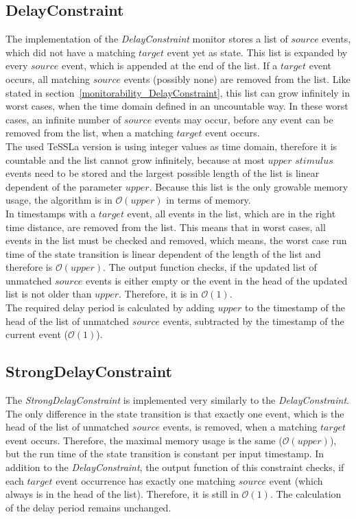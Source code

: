 \subsection{DelayConstraint}
	The implementation of the \emph{DelayConstraint} monitor stores a list of $source$ events, which did not have a matching $target$ event yet as state. This list is expanded by every $source$ event, which is appended at the end of the list. If a $target$ event occurs, all matching $source$ events (possibly none) are removed from the list. Like stated in section~\ref{monitorability_DelayConstraint}, this list can grow infinitely in worst cases, when the time domain defined in an uncountable way. In these worst cases, an infinite number of $source$ events may occur, before any event can be removed from the list, when a matching $target$ event occurs.\\
	The used TeSSLa version is using integer values as time domain, therefore it is countable and the list cannot grow infinitely, because at most $upper$ $stimulus$ events need to be stored and the largest possible length of the list is linear dependent of the parameter $upper$. Because this list is the only growable memory usage, the algorithm is in $\mathcal{O}(upper)$ in terms of memory.\\
	In timestamps with a $target$ event, all events in the list, which are in the right time distance, are removed from the list. This means that in worst cases, all events in the list must be checked and removed, which means, the worst case run time of the state transition is linear dependent of the length of the list and therefore is $\mathcal{O}(upper)$. %
	The output function checks, if the updated list of unmatched $source$ events is either empty or the event in the head of the updated list is not older than $upper$. Therefore, it is in $\mathcal{O}(1)$.\\
	The required delay period is calculated by adding $upper$ to the timestamp of the head of the list of unmatched $source$ events, subtracted by the timestamp of the current event ($\mathcal{O}(1)$).
	
\subsection{StrongDelayConstraint}
	The \emph{StrongDelayConstraint} is implemented very similarly to the \emph{DelayConstraint}. The only difference in the state transition is that exactly one event, which is the head of the list of unmatched $source$ events, is removed, when a matching $target$ event occurs. Therefore, the maximal memory usage is the same ($\mathcal{O}(upper)$), but the run time of the state transition is constant per input timestamp.
	In addition to the \textit{DelayConstraint}, the output function of this constraint checks, if each $target$ event occurrence has exactly one matching $source$ event (which always is in the head of the list). Therefore, it is still in $\mathcal{O}(1)$. The calculation of the delay period remains unchanged.
	
